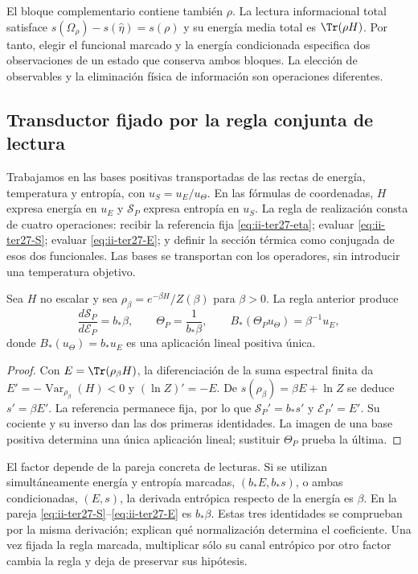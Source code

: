 El bloque complementario contiene también $\rho$. La lectura informacional
total satisface $s(\Omega_\rho)-s(\widehat\eta)=s(\rho)$ y su
energía media total es $\Tr(\rho H)$. Por tanto, elegir el funcional
marcado y la energía condicionada especifica dos observaciones de un estado
que conserva ambos bloques. La elección de observables y la eliminación
física de información son operaciones diferentes.

\subsection{Transductor fijado por la regla conjunta de lectura}
\label{subsec:ii-ter27-transducer}

Trabajamos en las bases positivas transportadas de las rectas de energía,
temperatura y entropía, con $u_S=u_E/u_\Theta$. En las fórmulas de
coordenadas, $H$ expresa energía en $u_E$ y $\mathcal S_P$ expresa
entropía en $u_S$. La regla de realización consta de cuatro operaciones:
recibir la referencia fija \eqref{eq:ii-ter27-eta}; evaluar
\eqref{eq:ii-ter27-S}; evaluar \eqref{eq:ii-ter27-E}; y definir la
sección térmica como conjugada de esos dos funcionales. Las bases se
transportan con los operadores, sin introducir una temperatura objetivo.

\begin{theorem}
\label{thm:ii-ter27-transducer}
Sea $H$ no escalar y sea
$\rho_\beta=e^{-\beta H}/Z(\beta)$ para $\beta>0$. La regla anterior
produce
\begin{equation}
 \frac{d\mathcal S_P}{d\mathcal E_P}=b_*\beta,
 \qquad \Theta_P=\frac1{b_*\beta},\qquad
 B_*(\Theta_Pu_\Theta)=\beta^{-1}u_E,
 \label{eq:ii-ter27-transducer}
\end{equation}
donde $B_*(u_\Theta)=b_*u_E$ es una aplicación lineal positiva única.
\end{theorem}
\begin{proof}
Con $E=\Tr(\rho_\beta H)$, la diferenciación de la suma espectral
finita da $E'=-\operatorname{Var}_{\rho_\beta}(H)<0$ y
$(\ln Z)'=-E$. De $s(\rho_\beta)=\beta E+\ln Z$ se deduce
$s'=\beta E'$. La referencia permanece fija, por lo que
$\mathcal S_P'=b_*s'$ y $\mathcal E_P'=E'$. Su cociente y su
inverso dan las dos primeras identidades. La imagen de una base positiva
determina una única aplicación lineal; sustituir $\Theta_P$ prueba la última.
\end{proof}

El factor depende de la pareja concreta de lecturas. Si se utilizan
simultáneamente energía y entropía marcadas, $(b_*E,b_*s)$, o ambas
condicionadas, $(E,s)$, la derivada entrópica respecto de la energía es
$\beta$. En la pareja \eqref{eq:ii-ter27-S}--\eqref{eq:ii-ter27-E}
es $b_*\beta$. Estas tres identidades se comprueban por la misma derivación;
explican qué normalización determina el coeficiente. Una vez fijada la
regla marcada, multiplicar sólo su canal entrópico por otro factor cambia
la regla y deja de preservar sus hipótesis.

